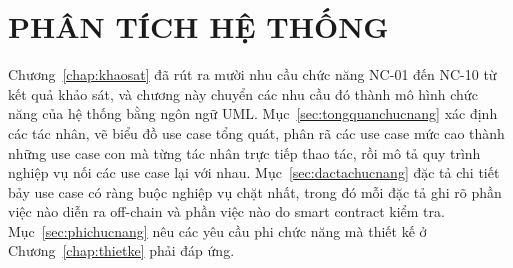 %
%
%

\chapter{PHÂN TÍCH HỆ THỐNG}
\label{chap:phantich}


Chương~\ref{chap:khaosat} đã rút ra mười nhu cầu chức năng NC-01 đến NC-10 từ kết quả khảo sát, và chương này chuyển các nhu cầu đó thành mô hình chức năng của hệ thống bằng ngôn ngữ UML. Mục~\ref{sec:tongquanchucnang} xác định các tác nhân, vẽ biểu đồ use case tổng quát, phân rã các use case mức cao thành những use case con mà từng tác nhân trực tiếp thao tác, rồi mô tả quy trình nghiệp vụ nối các use case lại với nhau. Mục~\ref{sec:dactachucnang} đặc tả chi tiết bảy use case có ràng buộc nghiệp vụ chặt nhất, trong đó mỗi đặc tả ghi rõ phần việc nào diễn ra off-chain và phần việc nào do smart contract kiểm tra. Mục~\ref{sec:phichucnang} nêu các yêu cầu phi chức năng mà thiết kế ở Chương~\ref{chap:thietke} phải đáp ứng.

